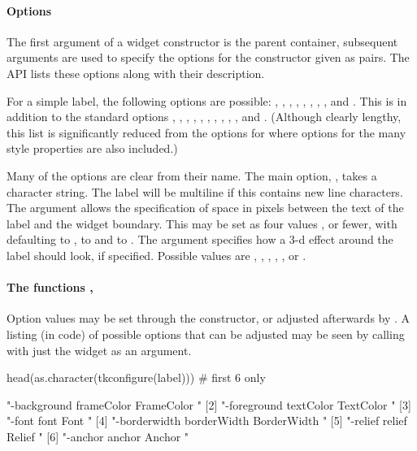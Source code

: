 \paragraph{Options}
The first argument of a widget constructor is the parent container,
subsequent arguments are used to specify the options for the
constructor given as  pairs. The \TK\/ API lists these
options along with their description.

For a simple label, the following options are possible: ,
, , , ,
, , , and .
This is in addition to the standard options ,
, , , ,
, , , ,
, and . (Although clearly lengthy, this
list is significantly reduced from the options for 
where options for the many style properties are also included.)

Many of the options are clear from their name.  The main option,
, takes a character string. The label will be multiline if
this contains new line characters.  The 
argument allows the specification of space in pixels between the text
of the label and the widget boundary. This may be set as four values
, or fewer, with 
defaulting to ,  to  and 
to . The  argument specifies how
a 3-d effect around the label should look, if specified. Possible
values are , , ,
, , or .

\paragraph{The functions , }
Option values may be set through the constructor, or adjusted
afterwards by . A listing (in \TCL\/ code) of possible options
that can be adjusted may be seen by calling 
with just the widget as an argument.

\begin{Schunk}
\begin{Sinput}
 head(as.character(tkconfigure(label)))      # first 6 only
\end{Sinput}
\begin{Soutput}
[1] "-background frameColor FrameColor {} {}"   
[2] "-foreground textColor TextColor {} {}"     
[3] "-font font Font {} {}"                     
[4] "-borderwidth borderWidth BorderWidth {} {}"
[5] "-relief relief Relief {} {}"               
[6] "-anchor anchor Anchor {} {}"               
\end{Soutput}
\end{Schunk}


